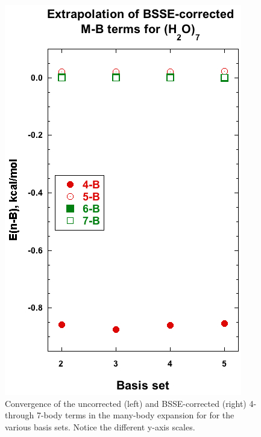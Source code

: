 \documentclass [11pt, proquest] {uwthesis}[2020/02/24]
\begin{document}
\begin{figure}[t]
\begin{center}
\begin{minipage}{0.45\textwidth}
\includegraphics[width=.9\textwidth]{Figures/Chapter_2/MB_extrap_w7_BSSE.jpg}
\end{minipage}
\end{center}
\label{fig:MBE_I_F4}
\caption[temp]{Convergence of the uncorrected (left) and BSSE-corrected (right) 4- through 7-body terms in the many-body expansion for  for the various basis sets. Notice the different y-axis scales.}
\end{figure}
\end{document}
